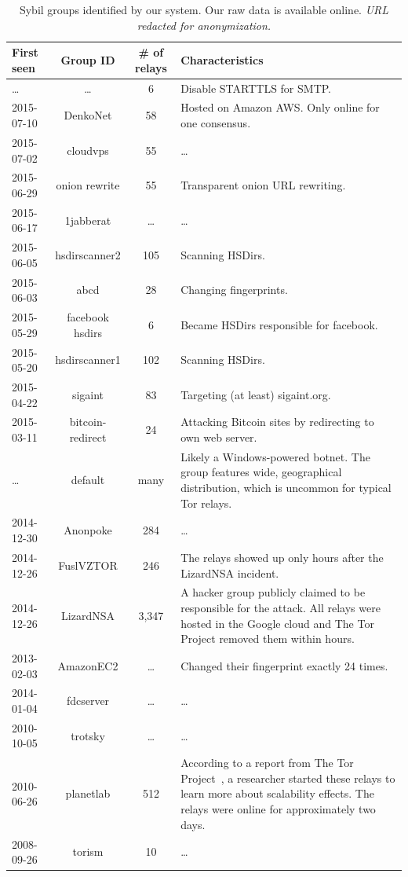 \begin{table}[t]
\centering
\begin{tabular}{l c c p{10cm}}
\textbf{First seen} & \textbf{Group ID} & \textbf{\# of relays} & \textbf{Characteristics} \\
\hline
\ldots & \ldots & 6 & Disable STARTTLS for SMTP. \\
2015-07-10 & DenkoNet & 58 & Hosted on Amazon AWS.  Only online for one consensus. \\
2015-07-02 & cloudvps & 55 & \ldots \\
2015-06-29 & onion rewrite & 55 & Transparent onion URL rewriting. \\
2015-06-17 & 1jabberat & \ldots & \ldots \\
2015-06-05 & hsdirscanner2 & 105 & Scanning HSDirs. \\
2015-06-03 & abcd & 28 & Changing fingerprints. \\
2015-05-29 & facebook hsdirs & 6 & Became HSDirs responsible for facebook.  \\
2015-05-20 & hsdirscanner1 & 102 & Scanning HSDirs. \\
2015-04-22 & sigaint & 83 & Targeting (at least) sigaint.org. \\
2015-03-11 & bitcoin-redirect & 24 & Attacking Bitcoin sites by redirecting to own web server. \\
\ldots & default & many & Likely a Windows-powered botnet.  The group
features wide, geographical distribution, which is uncommon for typical Tor
relays. \\
2014-12-30 & Anonpoke & 284 & \ldots\\
2014-12-26 & FuslVZTOR & 246 & The relays showed up only hours after the
LizardNSA incident. \\
2014-12-26 & LizardNSA & 3,347 & A hacker group publicly claimed to be
responsible for the attack.  All relays were hosted in the Google cloud and The
Tor Project removed them within hours. \\
2013-02-03 & AmazonEC2 & \ldots & Changed their fingerprint exactly 24 times. \\
2014-01-04 & fdcserver & \ldots & \ldots \\
2010-10-05 & trotsky & \ldots & \ldots \\
2010-06-26 & planetlab & 512 & According to a report from The Tor
Project~\cite{progressreport}, a researcher started these relays to learn more
about scalability effects.  The relays were online for approximately two days. \\
2008-09-26 & torism & 10 & \ldots \\
\end{tabular}
\caption{Sybil groups identified by our system.  Our raw data is available
online. \emph{URL redacted for anonymization.}}
\label{tab:sybils}
\end{table}

